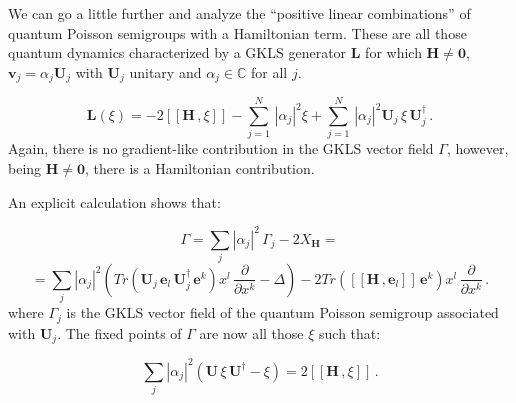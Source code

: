 \documentclass[11pt]{article}
\newcommand{\be}{\begin{equation}}
\newcommand{\ee}{\end{equation}}
\begin{document}
We can go a little further and analyze the ``positive linear combinations'' of quantum Poisson semigroups with a Hamiltonian term.
These are all those quantum dynamics characterized by a GKLS generator $\mathbf{L}$ for which $\mathbf{H}\neq\mathbf{0}$, $\mathbf{v}_{j}=\alpha_{j}\mathbf{U}_{j}$ with $\mathbf{U}_{j}$ unitary and $\alpha_{j}\in\mathbb{C}$ for all $j$.

\be\label{eqn: GKLS generator for linear combination of quantum poisson semigroups with hamiltonian}
\mathbf{L}(\xi)= -2\left[\left[\mathbf{H}\,,\xi\right]\right] -  \sum_{j=1}^{N}\,|\alpha_{j}|^{2}\xi +  \sum_{j=1}^{N}\,|\alpha_{j}|^{2}\mathbf{U}_{j}\,\xi\, \mathbf{U}^{\dagger}_{j}\,.
\ee
Again, there is no gradient-like contribution in the GKLS vector field $\Gamma$, however, being $\mathbf{H}\neq\mathbf{0}$, there is a Hamiltonian contribution.

An explicit calculation shows that:

$$
\Gamma = \sum_{j} |\alpha_{j}|^{2}\, \Gamma_{j} -2X_{\mathbf{H}} =
$$
\be\label{eqn: GKLS vector field for linear combinations of quantum poisson with hamiltonian}
=\sum_{j} |\alpha_{j}|^{2}\left(Tr\left(\mathbf{U}_{j}\,\mathbf{e}_{l}\,\mathbf{U}^{\dagger}_{j}\,\mathbf{e}^{k}\right)x^{l}\,\frac{\partial}{\partial x^{k}} -  \Delta\right) -
 2Tr\left([[\mathbf{H}\,,\mathbf{e}_{l}]]\,\mathbf{e}^{k}\right)x^{l}\,\frac{\partial}{\partial x^{k}}  \,.
\ee
where $\Gamma_{j}$ is the GKLS vector field of the quantum Poisson semigroup associated with $\mathbf{U}_{j}$.
The fixed points of $\Gamma$ are now all those $\xi$ such that:

\be
\sum_{j} |\alpha_{j}|^{2}\left(\mathbf{U}\,\xi\,\mathbf{U}^{\dagger} -\xi\right)= 2[[\mathbf{H}\,,\xi]]\,.
\ee
\end{document}
